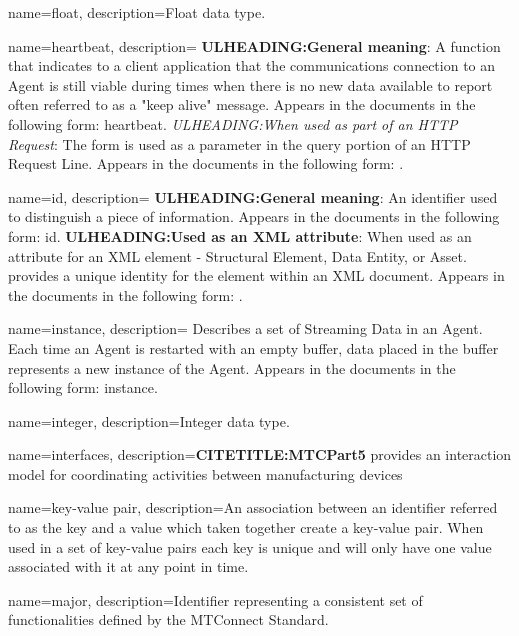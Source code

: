 {
    name={float},
	description={Float data type.}
}

{
    name={heartbeat},
	description={
	\textbf{ULHEADING:General meaning}:
	A function that indicates to a client application that the communications connection to an \gls{Agent} is still viable during times when there is no new data available to report  often referred to as a "keep alive" message.
	Appears in the documents in the following form: \gls{heartbeat}.
	\textit{ULHEADING:When used as part of an \gls{HTTP Request}}:
	The form  is used as a parameter in the query portion of an \gls{HTTP Request Line}.
	Appears in the documents in the following form: .
}
}

{
    name={id},
	description={
	\textbf{ULHEADING:General meaning}:
	An identifier used to distinguish a piece of information.
	Appears in the documents in the following form: id.
	\textbf{ULHEADING:Used as an XML attribute}:
	When used as an attribute for an XML element - \gls{Structural Element}, \gls{Data Entity}, or \gls{Asset}.   provides a unique identity for the element within an XML document.
	Appears in the documents in the following form: .
}
}

{
    name={instance},
	description={
	Describes a set of \gls{Streaming Data} in an \gls{Agent}.  Each time an \gls{Agent} is restarted with an empty \gls{buffer}, data placed in the \gls{buffer} represents a new \gls{instance} of the \gls{Agent}.
	Appears in the documents in the following form: \gls{instance}.
}
}

{
    name={integer},
	description={Integer data type.}
}

{
    name={interfaces},
	description={\textbf{CITETITLE:MTCPart5} provides an interaction model for coordinating activities between manufacturing devices}
}

{
    name={key-value pair},
	description={An association between an identifier referred to as the \gls{key} and a value which taken together create a \gls{key-value pair}. When used in a set of \glspl{key-value pair} each \gls{key} is unique and will only have one value associated with it at any point in time.}
}

{
    name={major},
	description={Identifier representing a consistent set of functionalities defined by the MTConnect Standard.}
}

